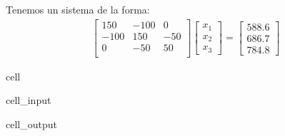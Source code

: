\documentclass[letterpaper,10pt,english]{jupyterBook}
\begin{document}
\sphinxAtStartPar
Tenemos un sistema de la forma:
\begin{equation*}
\begin{split}
\begin{bmatrix}
150 & -100 & 0\\
-100 & 150 & -50\\
0 & -50 & 50\\
\end{bmatrix}\left[\begin{array}{c} x_1 \\x_2 \\x_3 \end{array}\right] =
\left[\begin{array}{c} 588.6 \\686.7 \\784.8\end{array}\right]\end{split}
\end{equation*}
\begin{sphinxuseclass}{cell}\begin{sphinxVerbatimInput}

\begin{sphinxuseclass}{cell_input}
\begin{sphinxVerbatim}[commandchars=\\\{\}]
   

  \PYG{p}{[}\PYG{p}{[}     \PYG{p}{]} 
              \PYG{p}{[}   \PYG{p}{]} 
              \PYG{p}{[}       \PYG{p}{]}\PYG{p}{]}

  \PYG{p}{[}  \PYG{p}{]}

   
\end{sphinxVerbatim}

\end{sphinxuseclass}\end{sphinxVerbatimInput}
\begin{sphinxVerbatimOutput}

\begin{sphinxuseclass}{cell_output}
\begin{sphinxVerbatim}[commandchars=\\\{\}]
[41.202 55.917 71.613]
\end{sphinxVerbatim}

\end{sphinxuseclass}\end{sphinxVerbatimOutput}

\end{sphinxuseclass}
\end{document}
